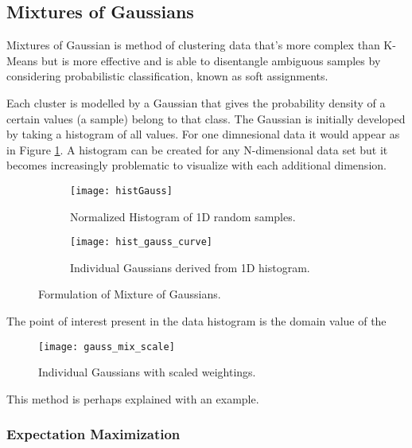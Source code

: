  \subsection{Mixtures of Gaussians}

Mixtures of Gaussian is method of clustering data that's more complex than K-Means but is more effective and is able to disentangle ambiguous samples by considering probabilistic classification, known as soft assignments. 

Each cluster is modelled by a Gaussian that gives the probability density of a certain values (a sample) belong to that class. The Gaussian is initially developed by taking a histogram of all values. For one dimnesional data it would appear as in Figure \ref{fig:histGauss}. A histogram can be created for any N-dimensional data set but it becomes increasingly problematic to visualize with each additional dimension.

\begin{figure}[H]
	\centering
	\begin{subfigure}[b]{0.5\linewidth}
            \centering\texttt{[image: histGauss]}
      		\caption{Normalized Histogram of 1D random samples.}
		\label{fig:histGauss}
    	\end{subfigure}%
    	\begin{subfigure}[b]{0.5\linewidth}
      		\centering\texttt{[image: hist\_gauss\_curve]}
      		\caption{Individual Gaussians derived from 1D histogram. }
       		\label{fig:histCurve}
    	\end{subfigure}
    	\caption{Formulation of Mixture of Gaussians.}
    	\label{fig:mixture}
\end{figure}

The point of interest present in the data histogram is the domain value of the 



\begin{figure}[H]
    \centering
    \centering\texttt{[image: gauss\_mix\_scale]}
    \caption{Individual Gaussians with scaled weightings.}
    \label{fig:histScale}
  \end{figure} 

This method is perhaps explained with an example. 




\subsubsection{Expectation Maximization}






